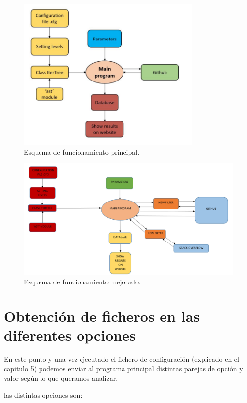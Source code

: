 \documentclass[a4paper, 12pt]{book}
\begin{document}
\begin{figure}
  \centering
  \includegraphics[width=9cm, keepaspectratio]{img/figura_funcionamiento_1.png}
  \caption{Esquema de funcionamiento principal.}\label{fig:arquitectura}
\end{figure}

\begin{figure}
    \centering
    \includegraphics[bb=0 0 800 600, width=12cm, keepaspectratio]{img/figura_funcionamiento_2}
    \caption{Esquema de funcionamiento mejorado.}\label{fig:_arquitectura}
\end{figure}

\section{Obtención de ficheros en las diferentes opciones} 
\label{sec:Obtención de ficheros en las diferentes opciones}

En este punto y una vez ejecutado el fichero de configuración (explicado en el capitulo 5) podemos enviar al programa principal distintas parejas de opción y valor según lo que queramos analizar.

las distintas opciones son:
\end{document}
